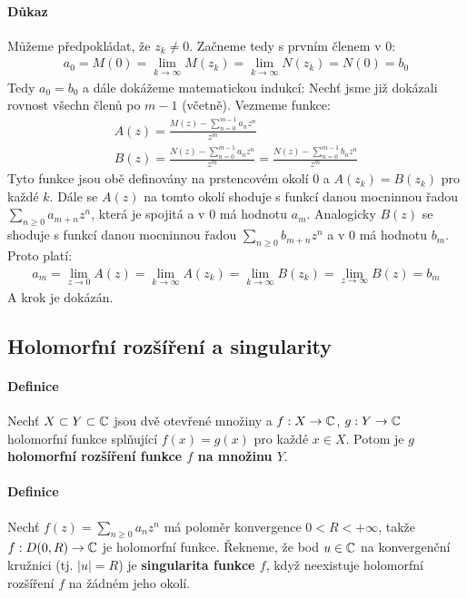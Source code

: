 \documentclass[a4paper,10pt]{article}
\begin{document}
\paragraph{Důkaz}
Můžeme předpokládat, že $z_k \neq 0$. Začneme tedy s prvním členem v $0$:
\begin{align}
	a_0 = M(0) = \lim_{k\to\infty} M(z_k) = \lim_{k\to\infty} N(z_k) = N(0) =
	b_0
\end{align}
Tedy $a_0 = b_0$ a dále dokážeme matematickou indukcí: Nechť jsme již dokázali
rovnost všechn členů po $m-1$ (včetně). Vezmeme funkce:
\begin{align}
	A(z) = \frac{M(z) - \sum_{n=0}^{m-1} a_nz^n}{z^m} \\
	B(z) = \frac{N(z) - \sum_{n=0}^{m-1} a_nz^n}{z^m}
		= \frac{N(z) - \sum_{n=0}^{m-1} b_nz^n}{z^m}
\end{align}
Tyto funkce jsou obě definovány na prstencovém okolí $0$ a $A(z_k) = B(z_k)$ pro
každé $k$. Dále se $A(z)$ na tomto okolí shoduje s funkcí danou mocninnou řadou
$\sum_{n\ge 0} a_{m+n} z^n$, která je spojitá a v $0$ má hodnotu $a_m$.
Analogicky $B(z)$ se shoduje s funkcí danou mocninnou řadou $\sum_{n\ge 0}
b_{m+n} z^n$ a v $0$ má hodnotu $b_m$. Proto platí:
\begin{align}
	a_m = \lim_{z\to0} A(z) = \lim_{k\to\infty} A(z_k) = \lim_{k\to\infty}
	B(z_k) = \lim_{z\to\infty} B(z) = b_m
\end{align}
A krok je dokázán.

\subsection{Holomorfní rozšíření a singularity}
\label{holomorf-roz-a-sing}
\setcounter{equation}{0}
\paragraph{Definice}
Nechť $X \subset Y \subset \mathbb{C}$ jsou dvě otevřené množiny a $f: X \to\mathbb{C}$, $g: Y
\to\mathbb{C}$ holomorfní funkce splňující $f(x) = g(x)$ pro každé $x\in X$. 
Potom je $g$ \textbf{holomorfní rozšíření funkce $f$ na množinu $Y$}.
\paragraph{Definice}
Nechť $f(z) = \sum_{n\ge 0} a_nz^n$ má poloměr konvergence $0 < R <
+\infty$, takže $f: D(0, R) \to \mathbb{C}$ je holomorfní funkce. Řekneme, že bod $u \in
\mathbb{C}$ na konvergenční kružnici (tj. $|u| = R$) je \textbf{singularita funkce $f$},
když neexistuje holomorfní rozšíření $f$ na žádném jeho okolí.
\end{document}
